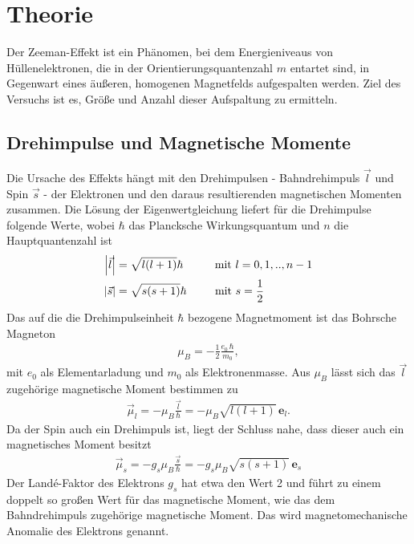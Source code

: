 

\section{Theorie}
\setcounter{page}{1}
Der Zeeman-Effekt ist ein Phänomen, bei dem Energieniveaus von Hüllenelektronen, die in der Orientierungsquantenzahl $m$ entartet sind, in Gegenwart eines
äußeren, homogenen Magnetfelds aufgespalten werden. Ziel des Versuchs ist es, Größe und Anzahl dieser Aufspaltung zu ermitteln.
\subsection{Drehimpulse und Magnetische Momente}
\label{sec_Jmu}
Die Ursache des Effekts hängt mit den Drehimpulsen - Bahndrehimpuls $\vec l$ und Spin $\vec s$ - der Elektronen und den daraus resultierenden 
magnetischen Momenten zusammen. Die Lösung der Eigenwertgleichung liefert für die Drehimpulse folgende Werte, wobei $\hbar$ das Plancksche Wirkungsquantum
und $n$ die Hauptquantenzahl ist
\begin{align}
 \left|\vec l\right| &= \sqrt{l(l+1)}\hbar \hspace{1cm} \text{mit } l=0,1,..,n-1\\
 \left|\vec s\right| &= \sqrt{s(s+1)}\hbar \hspace{0.9cm} \text{mit } s=\frac12
\end{align}
Das auf die die Drehimpulseinheit $\hbar$ bezogene Magnetmoment ist das Bohrsche Magneton
\begin{align}
 \mu_B = -\frac12\frac{e_0\,\hbar}{m_0},
\end{align}
mit $e_0$ als Elementarladung und $m_0$ als Elektronenmasse. Aus $\mu_B$ lässt sich das $\vec l$ zugehörige magnetische Moment bestimmen zu
\begin{align}
 \vec \mu_l = -\mu_B \frac{\vec l}{\hbar} = -\mu_B\sqrt{l(l+1)}\, \textbf{e}_l.
\end{align}
Da der Spin auch ein Drehimpuls ist, liegt der Schluss nahe, dass dieser auch ein magnetisches Moment besitzt
\begin{align}
 \vec \mu_s = -g_s \mu_B \frac{\vec s}{\hbar} = -g_s \mu_B \sqrt{s(s+1)}\, \textbf{e}_s
\end{align}
Der Landé-Faktor des Elektrons $g_s$ hat etwa den Wert 2 und führt zu einem doppelt so großen Wert für das magnetische Moment, wie das dem Bahndrehimpuls
zugehörige magnetische Moment. Das wird magnetomechanische Anomalie des Elektrons genannt.

